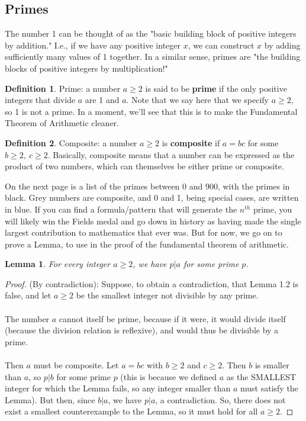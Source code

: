 \documentclass[10pt]{article}
\newtheorem{lemma}[theorem]{Lemma}
\theoremstyle{definition}
\newtheorem{definition}{Definition}[section]
\begin{document}
\subsection{Primes}
The number 1 can be thought of as the "basic building block of positive integers by addition."  I.e., if we have any positive integer $x$, we can construct $x$ by adding sufficiently many values of 1 together.  In a similar sense, primes are "the building blocks of positive integers by multiplication!"  
\begin{definition}{Prime:} a number $a\geq 2$ is said to be \textbf{prime} if the only positive integers that divide $a$ are 1 and $a$.  Note that we say here that we specify $a\geq 2$, so 1 is not a prime.  In a moment, we'll see that this is to make the Fundamental Theorem of Arithmetic cleaner.
\end{definition}
\begin{definition}{Composite:} a number $a\geq 2$ is \textbf{composite} if $a=bc$ for some $b\geq 2, ~c\geq 2$.  Basically, composite means that a number can be expressed as the product of two numbers, which can themselves be either prime or composite.  
\end{definition}
On the next page is a list of the primes between 0 and 900, with the primes in black.  Grey numbers are composite, and 0 and 1, being special cases, are written in blue.  If you can find a formula/pattern that will generate the $n^{th}$ prime, you will likely win the Fields medal and go down in history as having made the single largest contribution to mathematics that ever was.  But for now, we go on to prove a Lemma, to use in the proof of the fundamental theorem of arithmetic.
\begin{lemma}
For every integer $a \geq 2$, we have $p|a$ for some prime $p$.
\end{lemma}
\begin{proof}
(By contradiction): Suppose, to obtain a contradiction, that Lemma 1.2 is false, and let $a\geq 2$ be the smallest integer not divisible by any prime.  \\~\\
The number $a$ cannot itself be prime, because if it were, it would divide itself (because the division relation is reflexive), and would thus be divisible by a prime. \\~\\
Then $a$ must be composite.  Let $a=bc$ with $b\geq 2$ and $c\geq 2$.  Then $b$ is smaller than $a$, so $p|b$ for some prime $p$ (this is because we defined $a$ as the SMALLEST integer for which the Lemma fails, so any integer smaller than $a$ must satisfy the Lemma).  But then, since $b|a$, we have $p|a$, a contradiction.  So, there does not exist a smallest counterexample to the Lemma, so it must hold for all $a\geq 2$.    
\end{proof}
\end{document}
